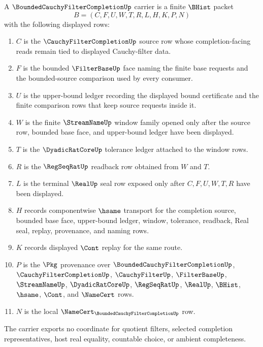 \begin{definition}
\label{def:bounded-cauchy-filter-completion-carrier}
A $\BoundedCauchyFilterCompletionUp$ carrier is a finite $\BHist$ packet
$$
B=(C,F,U,W,T,R,L,H,K,P,N)
$$
with the following displayed rows:
\begin{enumerate}
\item $C$ is the $\CauchyFilterCompletionUp$ source row whose completion-facing reads remain tied to displayed Cauchy-filter data.
\item $F$ is the bounded $\FilterBaseUp$ face naming the finite base requests and the bounded-source comparison used by every consumer.
\item $U$ is the upper-bound ledger recording the displayed bound certificate and the finite comparison rows that keep source requests inside it.
\item $W$ is the finite $\StreamNameUp$ window family opened only after the source row, bounded base face, and upper-bound ledger have been displayed.
\item $T$ is the $\DyadicRatCoreUp$ tolerance ledger attached to the window rows.
\item $R$ is the $\RegSeqRatUp$ readback row obtained from $W$ and $T$.
\item $L$ is the terminal $\RealUp$ seal row exposed only after $C,F,U,W,T,R$ have been displayed.
\item $H$ records componentwise $\hsame$ transport for the completion source, bounded base face, upper-bound ledger, window, tolerance, readback, Real seal, replay, provenance, and naming rows.
\item $K$ records displayed $\Cont$ replay for the same route.
\item $P$ is the $\Pkg$ provenance over $\BoundedCauchyFilterCompletionUp$, $\CauchyFilterCompletionUp$, $\CauchyFilterUp$, $\FilterBaseUp$, $\StreamNameUp$, $\DyadicRatCoreUp$, $\RegSeqRatUp$, $\RealUp$, $\BHist$, $\hsame$, $\Cont$, and $\NameCert$ rows.
\item $N$ is the local $\NameCert_{\BoundedCauchyFilterCompletionUp}$ row.
\end{enumerate}
The carrier exports no coordinate for quotient filters, selected completion representatives, host real equality, countable choice, or ambient completeness.
\end{definition}

